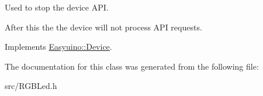 Used to stop the device A\+PI. 

After this the the device will not process A\+PI requests. 

Implements \hyperlink{class_easyuino_1_1_device_ab31018ef64adc84aa2ea575b2297548f}{Easyuino\+::\+Device}.



The documentation for this class was generated from the following file\+:\begin{DoxyCompactItemize}
\item 
src/R\+G\+B\+Led.\+h\end{DoxyCompactItemize}

